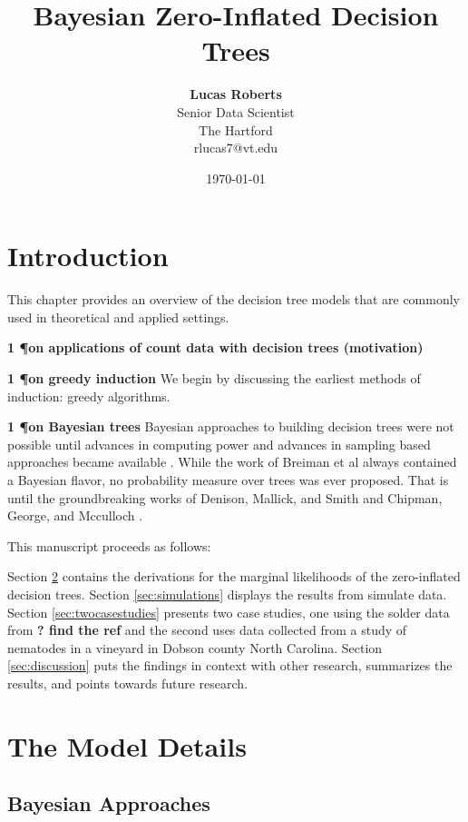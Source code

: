 \documentclass{article}
\title{{\bf Bayesian Zero-Inflated Decision Trees} \\ }
\author{ {\bf Lucas Roberts}  \\
Senior Data Scientist \\
The Hartford \\
{\small rlucas7@vt.edu}
}
\date{\today}
\begin{document}
\maketitle


\section{Introduction}
\label{ch:preliminaries}
This chapter provides an overview of the decision tree models that are commonly used in theoretical and applied settings. 

\textbf{1 \P on applications of count data with decision trees (motivation)}

\textbf{1 \P on greedy induction }We begin by discussing the earliest methods of induction: greedy algorithms. 

\textbf{1 \P on Bayesian trees }Bayesian approaches to building decision trees were not possible until advances in computing power and advances in sampling based approaches became available \cite{gelfand1990sampling}. While the work of Breiman et al \cite{breiman1984classification} always contained a Bayesian flavor, no probability measure over trees was ever proposed. That is until the groundbreaking works of Denison, Mallick, and Smith \cite{denison1998bayesian} and Chipman, George, and Mcculloch \cite{chipman1998bayesian}.

This manuscript proceeds as follows: 

Section \ref{sec:derivations} contains the derivations for the marginal likelihoods of the zero-inflated decision trees. 
Section \ref{sec:simulations} displays the results from simulate data. 
Section \ref{sec:twocasestudies} presents two case studies, one using the solder data from \textbf{? find the ref}  \cite{}  and the second uses data collected from a study of nematodes in a vineyard in Dobson county North Carolina. 
Section \ref{sec:discussion} puts the findings in context with other research, summarizes the results, and points towards future research. 

\section{The Model Details}
\label{sec:derivations}

\subsection{Bayesian Approaches}
\label{ch:p2sub_bayes}
\end{document}
